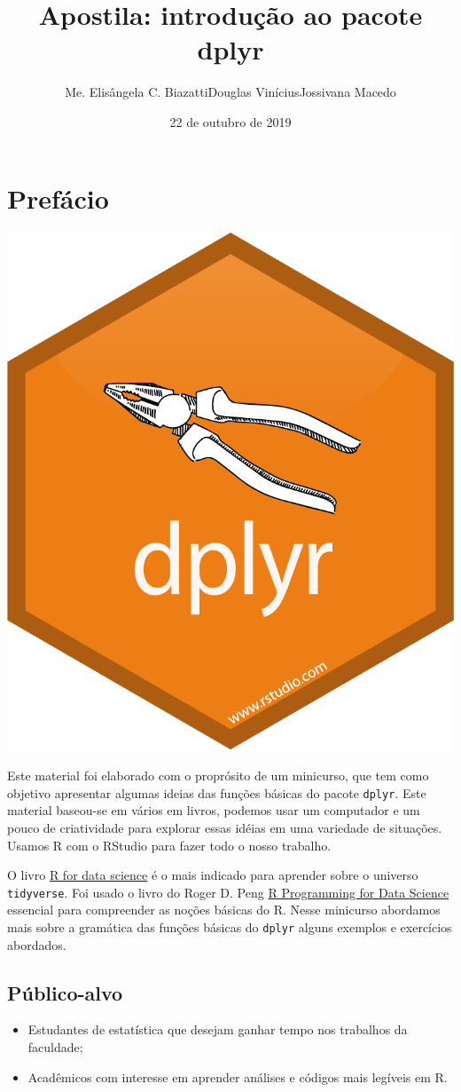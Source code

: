\documentclass[a4paper]{book}
\title{Apostila: introdução ao pacote dplyr}
\author{Me. Elisângela C. BiazattiDouglas ViníciusJossivana Macedo}
\date{22 de outubro de 2019}
\providecommand{\tightlist}{%
  \setlength{\itemsep}{0pt}\setlength{\parskip}{0pt}}
\begin{document}
\maketitle

{
\setcounter{tocdepth}{1}
\tableofcontents
}
\hypertarget{prefuxe1cio}{%
\chapter{Prefácio}\label{prefuxe1cio}}

\begin{center}\includegraphics[width=0.3\linewidth]{imagens/dplyr} \end{center}

Este material foi elaborado com o proprósito de um minicurso, que tem como objetivo apresentar algumas ideias das funções básicas do pacote \texttt{dplyr}. Este material baseou-se em vários em livros, podemos usar um computador e um pouco de criatividade para explorar essas idéias em uma variedade de situações. Usamos R com o RStudio para fazer todo o nosso trabalho.

O livro \href{https://r4ds.had.co.nz/}{R for data science} é o mais indicado para aprender sobre o universo \texttt{tidyverse}. Foi usado o livro do Roger D. Peng \href{https://bookdown.org/rdpeng/rprogdatascience/}{R Programming for Data Science} essencial para compreender as noções básicas do R. Nesse minicurso abordamos mais sobre a gramática das funções básicas do \texttt{dplyr} alguns exemplos e exercícios abordados.

\hypertarget{puxfablico-alvo}{%
\section{Público-alvo}\label{puxfablico-alvo}}

\begin{itemize}
\tightlist
\item
  Estudantes de estatística que desejam ganhar tempo nos trabalhos da faculdade;
\item
  Acadêmicos com interesse em aprender análises e códigos mais legíveis em R.
\end{itemize}
\end{document}
